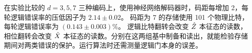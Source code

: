 在实验比较的 $d = 3,5,7$ 三种编码上，使用神经网络解码器时，码距每增加 2，每轮逻辑错误率的压低因子为 $2.14 \pm 0.02$。
码距为 7 的存储使用 101 个物理比特，每轮逻辑错误率为 $(0.143 \pm 0.003)\%$。
逻辑比特翻转会改变 $\hat{Z}$ 本征态的读数，相位翻转会改变 $\hat{X}$ 本征态的读数。分别在这两组基中制备和读出，就能检验存储期间对两类错误的保护。运行算法时还需测量逻辑门本身的误差。

